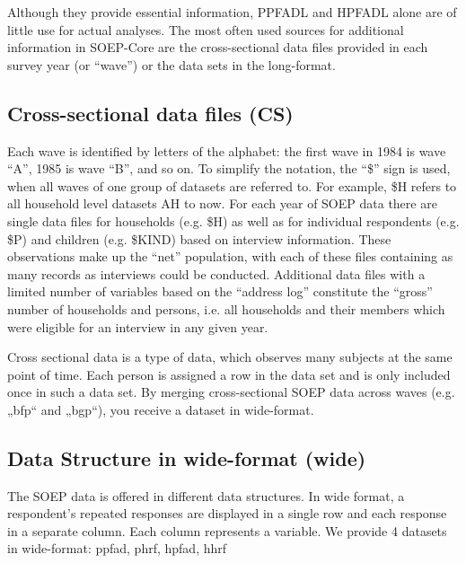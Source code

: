 \documentclass[letterpaper,10pt,openany,onesideH,english]{sphinxmanual}
\begin{document}
Although they provide essential information, PPFADL and HPFADL alone are of little use for actual analyses. The most often used sources for additional information in SOEP-Core are the cross-sectional data files provided in each survey year (or “wave”) or the data sets in the long-format.


\subsection{Cross-sectional data files (CS)}
\label{\detokenize{Principles of Data Structure/index:cross-sectional-data-files-cs}}\label{\detokenize{Principles of Data Structure/index:cross}}
\begin{figure}[H]
\centering

\noindent{}
\end{figure}

Each wave is identified by letters of the alphabet: the first wave in 1984 is wave “A”, 1985 is wave “B”, and so on. To simplify the notation, the “\$” sign is used, when all waves of one group of datasets are referred to. For example, \$H refers to all household level datasets AH to now. For each year of SOEP data there are single data files for households (e.g. \$H) as well as for individual respondents (e.g. \$P) and children (e.g. \$KIND) based on interview information. These observations make up the “net” population, with each of these files containing as many records as interviews could be conducted. Additional data files with a limited number of variables based on the “address log” constitute the “gross” number of households and persons, i.e. all households and their members which were eligible for an interview in any given year.


Cross sectional data is a type of data, which observes many subjects at the same point of time. Each person is assigned a row in the data set and is only included once in such a data set. By merging cross-sectional SOEP data across waves (e.g. „bfp“ and „bgp“), you receive a dataset in wide-format.


\subsection{Data Structure in wide-format (wide)}
\label{\detokenize{Principles of Data Structure/index:data-structure-in-wide-format-wide}}
The SOEP data is offered in different data structures. In wide format, a respondent’s repeated responses are displayed in a single row and each response in a separate column. Each column represents a variable. We provide 4 datasets in wide-format: ppfad, phrf, hpfad, hhrf
\end{document}
